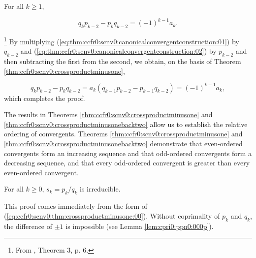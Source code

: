 \begin{vworktheoremstatement}
\label{thm:ccfr0:scnv0:crossproductminusonebacktwo}
For all $k \geq 1$,

\begin{equation}
q_k p_{k-2} - p_k q_{k-2} = (-1)^{k-1} a_k .
\end{equation}
\end{vworktheoremstatement}
\begin{vworktheoremproof}\hspace{-0.4em}\footnote{From
\cite{bibref:b:KhinchinClassic}, Theorem 3, p. 6.}
By multiplying (\ref{eq:thm:ccfr0:scnv0:canonicalconvergentconstruction:01}) 
by $q_{k-2}$ and 
(\ref{eq:thm:ccfr0:scnv0:canonicalconvergentconstruction:02}) 
by $p_{k-2}$ and then subtracting the first from the
second, we obtain, on the basis of Theorem 
\ref{thm:ccfr0:scnv0:crossproductminusone},

\begin{equation}
q_k p_{k-2} - p_k q_{k-2} 
= a_k (q_{k-1} p_{k-2} - p_{k-1} q_{k-2}) = (-1)^{k-1} a_k ,
\end{equation}
which completes the proof.
\end{vworktheoremproof}
\vworktheoremfooter{}

The results in Theorems \ref{thm:ccfr0:scnv0:crossproductminusone}
and \ref{thm:ccfr0:scnv0:crossproductminusonebacktwo} allow us
to establish the relative ordering of convergents.
Theorems \ref{thm:ccfr0:scnv0:crossproductminusone} and
\ref{thm:ccfr0:scnv0:crossproductminusonebacktwo} demonstrate that
even-ordered convergents form an increasing sequence and that odd-ordered
convergents form a decreasing sequence, and that every odd-ordered convergent
is greater than every even-ordered convergent.

\begin{vworktheoremstatement}
\label{thm:ccfr0:scnv0:irreducibility}
For all $k \geq 0$, $s_k = p_k/q_k$ is
irreducible.
\end{vworktheoremstatement}
\begin{vworktheoremproof}
This proof comes immediately from the form
of (\ref{eq:ccfr0:scnv0:thm:crossproductminusone:00}).
Without coprimality of $p_k$ and $q_k$, the difference
of $\pm 1$ is impossible (see
Lemma \ref{lem:cpri0:ppn0:000p}).
\end{vworktheoremproof}

